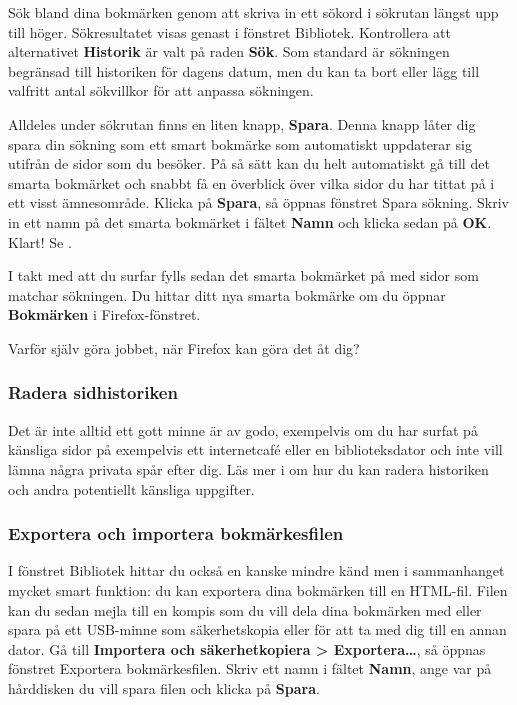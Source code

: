 \documentclass[a4paper,final]{memoir} %
\begin{document}

Sök bland dina bokmärken genom att skriva in ett sökord i sökrutan längst upp till höger. Sökresultatet visas genast i fönstret Bibliotek. Kontrollera att alternativet \textbf{Historik} är valt på raden \textbf{Sök}. Som standard är sökningen begränsad till historiken för dagens datum, men du kan ta bort eller lägg till valfritt antal sökvillkor för att anpassa sökningen.

Alldeles under sökrutan finns en liten knapp, \textbf{Spara}. Denna knapp låter dig spara din sökning som ett smart bokmärke som automatiskt uppdaterar sig utifrån de sidor som du besöker. På så sätt kan du helt automatiskt gå till det smarta bokmärket och snabbt få en överblick över vilka sidor du har tittat på i ett visst ämnesområde. Klicka på \textbf{Spara}, så öppnas fönstret Spara sökning. Skriv in ett namn på det smarta bokmärket i fältet \textbf{Namn} och klicka sedan på \textbf{OK}. Klart! Se .

I takt med att du surfar fylls sedan det smarta bokmärket på med sidor som matchar sökningen. Du hittar ditt nya smarta bokmärke om du öppnar \textbf{Bokmärken} i Firefox-fönstret.

Varför själv göra jobbet, när Firefox kan göra det åt dig?

\subsubsection{Radera sidhistoriken}

Det är inte alltid ett gott minne är av godo, exempelvis om du har surfat på känsliga sidor på exempelvis ett internetcafé eller en biblioteksdator och inte vill lämna några privata spår efter dig. Läs mer i  om hur du kan radera historiken och andra potentiellt känsliga uppgifter.

\subsubsection{Exportera och importera bokmärkesfilen}

I fönstret Bibliotek hittar du också en kanske mindre känd men i sammanhanget mycket smart funktion: du kan exportera dina bokmärken till en HTML-fil. Filen kan du sedan mejla till en kompis som du vill dela dina bokmärken med eller spara på ett USB-minne som säkerhetskopia eller för att ta med dig till en annan dator. Gå till \textbf{Importera och säkerhetkopiera \textgreater{} Exportera\ldots{}}, så öppnas fönstret Exportera bokmärkesfilen. Skriv ett namn i fältet \textbf{Namn}, ange var på hårddisken du vill spara filen och klicka på \textbf{Spara}.
\end{document}
